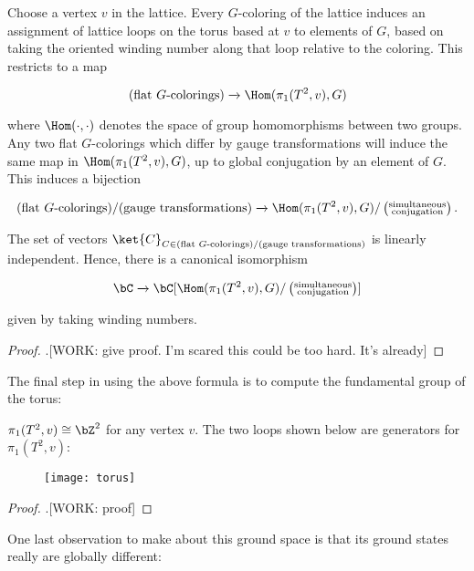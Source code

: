 \begin{prop} Choose a vertex $v$ in the lattice. Every $G$-coloring of the lattice induces an assignment of lattice loops on the torus based at $v$ to elements of $G$, based on taking the oriented winding number along that loop relative to the coloring. This restricts to a map

$$(\text{flat $G$-colorings})\xrightarrow{}\Hom(\pi_1(T^2,v), G)$$

where $\Hom(\cdot,\cdot)$ denotes the space of group homomorphisms between two groups. Any two flat $G$-colorings which differ by gauge transformations will induce the same map in $\Hom(\pi_1(T^2,v), G)$, up to global conjugation by an element of $G$. This induces a bijection

$$(\text{flat $G$-colorings})/(\text{gauge transformations})\xrightarrow{}\Hom(\pi_1(T^2,v), G)/\left(\substack{\text{simultaneous} \\ \text{conjugation}}\right).$$

The set of vectors ${\ket{C}}_{C\in (\text{flat $G$-colorings})/(\text{gauge transformations})}$ is linearly independent. Hence, there is a canonical isomorphism

$$\bC \xrightarrow{}\bC[\Hom(\pi_1(T^2,v), G)/\left(\substack{\text{simultaneous} \\ \text{conjugation}}\right)]$$

given by taking winding numbers.
\end{prop}
\begin{proof}.[WORK: give proof. I'm scared this could be too hard. It's already]
\end{proof}

The final step in using the above formula is to compute the fundamental group of the torus:

\begin{prop} $\pi_1(T^2,v)\cong \bZ^2$ for any vertex $v$. The two loops shown below are generators for $\pi_1(T^2,v)$:

\begin{figure}[h]
\begin{center}
\texttt{[image: torus]}
\end{center}
\end{figure}

\end{prop}
\begin{proof}.[WORK: proof]
\end{proof}

One last observation to make about this ground space is that its ground states really are globally different:

